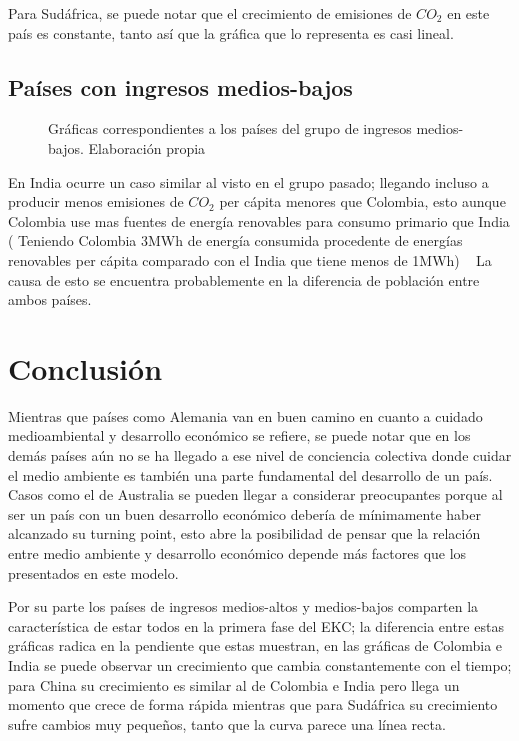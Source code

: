 \documentclass[11 pt]{article}
\begin{document}
Para Sudáfrica, se puede notar que el crecimiento de emisiones de $CO_2$ en este país es constante, tanto así que la gráfica que lo representa es casi lineal.

\subsection{Países con ingresos medios-bajos}

\begin{figure}[!htb]
 \centering
 \caption{Gráficas correspondientes a los países del grupo de ingresos medios-bajos. Elaboración propia}
    \end{figure}
    
    En India ocurre un caso similar al visto en el grupo pasado; llegando incluso a producir menos emisiones de $CO_2$ per cápita menores que Colombia, esto aunque Colombia use mas fuentes de energía renovables para consumo primario que India ( Teniendo Colombia 3MWh de energía consumida procedente de energías renovables per cápita comparado con el India que tiene menos de 1MWh) ~\cite{owid}
    La causa de esto se encuentra probablemente en la diferencia de población entre ambos países.

\section{Conclusión}

Mientras que países como Alemania van en buen camino en cuanto a cuidado medioambiental y desarrollo económico se refiere, se puede notar que en los demás países aún no se ha llegado a ese nivel de conciencia colectiva donde cuidar el medio ambiente es también una parte fundamental del desarrollo de un país. Casos como el de Australia se pueden llegar a considerar preocupantes porque al ser un país con un buen desarrollo económico debería de mínimamente haber alcanzado su turning point, esto abre la posibilidad de pensar que la relación entre medio ambiente y desarrollo económico depende más factores que los presentados en este modelo. 

Por su parte los países de ingresos medios-altos y medios-bajos comparten la característica de estar todos en la primera fase del EKC; la diferencia entre estas gráficas radica en la pendiente que estas muestran, en las gráficas de Colombia e India se puede observar un crecimiento que cambia constantemente con el tiempo; para China su crecimiento es similar al de Colombia e India pero llega un momento que crece de forma rápida mientras que para Sudáfrica su crecimiento sufre cambios muy pequeños, tanto que la curva parece una línea recta. 




\end{document}
